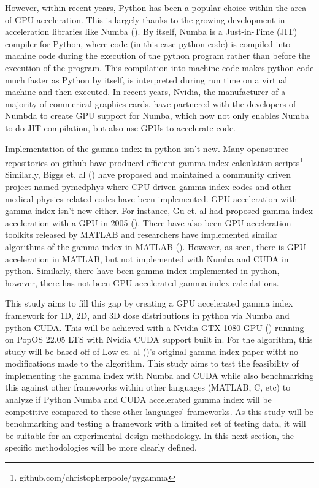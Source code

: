 \documentclass[12pt]{article}
\begin{document}
However, within recent years, Python has been a popular choice within the area of GPU acceleration. This is largely thanks to the growing development in acceleration libraries like Numba (\textcite{Lam}). By itself, Numba is a Just-in-Time (JIT) compiler for Python, where code (in this case python code) is compiled into machine code during the execution of the python program rather than before the execution of the program. This compilation into machine code makes python code much faster as Python by itself, is interpreted during run time on a virtual machine and then executed. In recent years, Nvidia, the manufacturer of a majority of commerical graphics cards, have partnered with the developers of Numbda to create GPU support for Numba, which now not only enables Numba to do JIT compilation, but also use GPUs to accelerate code.

Implementation of the gamma index in python isn’t new. Many opensource repositories on github have produced efficient gamma index calculation scripts\footnote[1]{github.com/christopherpoole/pygamma} Similarly, Biggs et. al (\textcite{Biggs}) have proposed and maintained a community driven project named pymedphys where CPU driven gamma index codes and other medical physics related codes have been implemented. GPU acceleration with gamma index isn’t new either. For instance, Gu et. al had proposed gamma index acceleration with a GPU in 2005 (\textcite{Gu}). There have also been GPU acceleration toolkits released by MATLAB and researchers have implemented similar algorithms of the gamma index in MATLAB (\textcite{Matlab}). However, as seen, there is GPU acceleration in MATLAB, but not implemented with Numba and CUDA in python. Similarly, there have been gamma index implemented in python, however, there has not been GPU accelerated gamma index calculations.

This study aims to fill this gap by creating a GPU accelerated gamma index framework for 1D, 2D, and 3D dose distributions in python via Numba and python CUDA. This will be achieved with a Nvidia GTX 1080 GPU (\textcite{NVidia}) running on PopOS 22.05 LTS with Nvidia CUDA support built in. For the algorithm, this study will be based off of Low et. al (\textcite{Low})’s original gamma index paper witht no modifications made to the algorithm. This study aims to test the feasibility of implementing the gamma index with Numba and CUDA while also benchmarking this against other frameworks within other languages (MATLAB, C, etc) to analyze if Python Numba and CUDA accelerated gamma index will be competitive compared to these other languages’ frameworks. As this study will be benchmarking and testing a framework with a limited set of testing data, it will be suitable for an experimental design methodology. In this next section, the specific methodologies will be more clearly defined.
\pagebreak

\printbibliography
\end{document}
